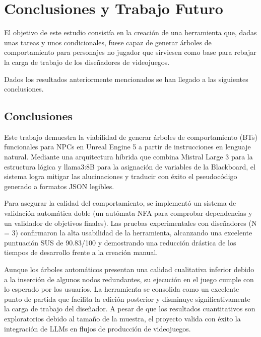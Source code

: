 \chapter{Conclusiones y Trabajo Futuro}
\label{cap:conclusiones}

El objetivo de este estudio consistía en la creación de una herramienta que, dadas unas tareas y unos condicionales, fuese capaz de generar árboles de comportamiento para personajes no jugador que sirviesen como base para rebajar la carga de trabajo de los diseñadores de videojuegos.

Dados los resultados anteriormente mencionados se han llegado a las siguientes conclusiones.

\section{Conclusiones}

Este trabajo demuestra la viabilidad de generar árboles de comportamiento (BTs) funcionales para NPCs en Unreal Engine 5 a partir de instrucciones en lenguaje natural.
Mediante una arquitectura híbrida que combina Mistral Large 3 para la estructura lógica y llama3:8B para la asignación de variables de la Blackboard, el sistema logra mitigar las alucinaciones y traducir con éxito el pseudocódigo generado a formatos JSON legibles.

Para asegurar la calidad del comportamiento, se implementó un sistema de validación automática doble (un autómata NFA para comprobar dependencias y un validador de objetivos finales).
Las pruebas experimentales con diseñadores (N = 3) confirmaron la alta usabilidad de la herramienta, alcanzando una excelente puntuación SUS de 90.83/100 y demostrando una reducción drástica de los tiempos de desarrollo frente a la creación manual.

Aunque los árboles automáticos presentan una calidad cualitativa inferior debido a la inserción de algunos nodos redundantes, su ejecución en el juego cumple con lo esperado por los usuarios.
La herramienta se consolida como un excelente punto de partida que facilita la edición posterior y disminuye significativamente la carga de trabajo del diseñador.
A pesar de que los resultados cuantitativos son exploratorios debido al tamaño de la muestra, el proyecto valida con éxito la integración de LLMs en flujos de producción de videojuegos.



